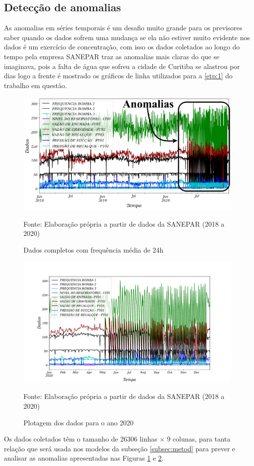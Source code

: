  

\subsection{Detec\c cão de anomalias} \label{subsec:detec}


As anomalias em séries temporais é um desafio muito grande para os previsores saber quando os dados sofrem uma mudança se ela não estiver muito evidente nos dados é um exercício de concentração, com isso os dados coletados ao longo do tempo pela empresa SANEPAR traz as anomalias mais claras do que se imaginava, pois a falta de água que sofreu a cidade de Curitiba se alastrou por dias logo a frente é mostrado os gráficos de linha utilizados para a \ref{etp:1} do trabalho em questão.

\begin{figure}[H]
	\centering
	\caption{Dados completos com frequência média de 24h}
	\label{fig:dados-todos}
	\includegraphics[width=1\linewidth]{"Introducao/Figuras/dados todos"}
	
	Fonte: Elaboração própria a partir de dados da SANEPAR (2018 a 2020)
\end{figure}

\begin{figure}[H]
	\centering
	\caption{Plotagem dos dados para o ano 2020}
	\label{fig:2020-a-frente}
	\includegraphics[width=1\linewidth]{"Introducao/Figuras/2020 a frente"}
	
	Fonte: Elaboração própria a partir de dados da SANEPAR (2018 a 2020)
\end{figure}

Os dados coletados têm o tamanho de 26306 linhas × 9 colunas, para tanta relação que será usada nos modelos da subseção \ref{subsec:metod} para prever e analisar as anomalias apresentadas nas Figuras \ref{fig:dados-todos} e \ref{fig:2020-a-frente}.






